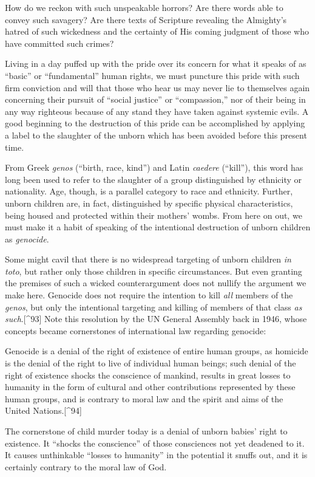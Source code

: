 \documentclass[
]{book}
\begin{document}
How do we reckon with such unspeakable horrors? Are there words able to convey such savagery? Are there texts of Scripture revealing the Almighty's hatred of such wickedness and the certainty of His coming judgment of those who have committed such crimes?

Living in a day puffed up with the pride over its concern for what it speaks of as ``basic'' or ``fundamental'' human rights, we must puncture this pride with such firm conviction and will that those who hear us may never lie to themselves again concerning their pursuit of ``social justice'' or ``compassion,'' nor of their being in any way righteous because of any stand they have taken against systemic evils. A good beginning to the destruction of this pride can be accomplished by applying a label to the slaughter of the unborn which has been avoided before this present time.

From Greek \emph{genos} (``birth, race, kind'') and Latin \emph{caedere} (``kill''), this word has long been used to refer to the slaughter of a group distinguished by ethnicity or nationality. Age, though, is a parallel category to race and ethnicity. Further, unborn children are, in fact, distinguished by specific physical characteristics, being housed and protected within their mothers' wombs. From here on out, we must make it a habit of speaking of the intentional destruction of unborn children as \emph{genocide}.

Some might cavil that there is no widespread targeting of unborn children \emph{in toto}, but rather only those children in specific circumstances. But even granting the premises of such a wicked counterargument does not nullify the argument we make here. Genocide does not require the intention to kill \emph{all} members of the \emph{genos}, but only the intentional targeting and killing of members of that class \emph{as such}.{[}\^{}93{]} Note this resolution by the UN General Assembly back in 1946, whose concepts became cornerstones of international law regarding genocide:

Genocide is a denial of the right of existence of entire human groups, as homicide is the denial of the right to live of individual human beings; such denial of the right of existence shocks the conscience of mankind, results in great losses to humanity in the form of cultural and other contributions represented by these human groups, and is contrary to moral law and the spirit and aims of the United Nations.{[}\^{}94{]}

The cornerstone of child murder today is a denial of unborn babies' right to existence. It ``shocks the conscience'' of those consciences not yet deadened to it. It causes unthinkable ``losses to humanity'' in the potential it snuffs out, and it is certainly contrary to the moral law of God.
\end{document}

